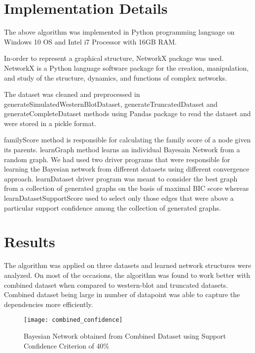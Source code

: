 \documentclass[conference]{IEEEtran}
\begin{document}
\section{Implementation Details}
The above algorithm was implemented in Python programming language on Windows 10 OS and Intel i7 Processor with 16GB RAM.
\par
In-order to represent a graphical structure, NetworkX package was used. NetworkX is a Python language software package for the creation, manipulation, and study of the structure, dynamics, and functions of complex networks.
\par
The dataset was cleaned and preprocessed in generateSimulatedWesternBlotDataset, generateTruncatedDataset and generateCompleteDataset methods using Pandas package to read the dataset and were stored in a pickle format.
\par
familyScore method is responsible for calculating the family score of a node given its parents. learnGraph method learns an individual Bayesain Network from a random graph. We had used two driver programs that were responsible for learning the Bayesian network from different datasets using different convergence approach. learnDataset driver program was meant to consider the best graph from a collection of generated graphs on the basis of maximal BIC score whereas learnDatasetSupportScore used to select only those edges that were above a particular support confidence among the collection of generated graphs.

\section{Results}
The algorithm was applied on three datasets and learned network structures were analyzed. On most of the occasions, the algorithm was found to work better with combined dataset when compared to western-blot and truncated datasets. Combined dataset being large in number of datapoint was able to capture the dependencies more efficiently.

\begin{figure}[h]
\centering
\texttt{[image: combined\_confidence]}
\label{fig1}
\caption{Bayesian Network obtained from Combined Dataset using Support Confidence Criterion of 40\%}
\end{figure}
\end{document}
